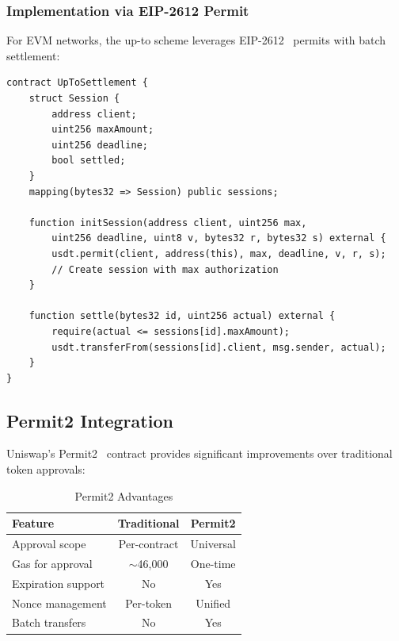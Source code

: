 \subsubsection{Implementation via EIP-2612 Permit}

For EVM networks, the up-to scheme leverages EIP-2612~\cite{eip2612} permits with batch settlement:

\begin{lstlisting}[language=solidity, caption={Up-To Settlement Contract (Simplified)}]
contract UpToSettlement {
    struct Session {
        address client;
        uint256 maxAmount;
        uint256 deadline;
        bool settled;
    }
    mapping(bytes32 => Session) public sessions;

    function initSession(address client, uint256 max,
        uint256 deadline, uint8 v, bytes32 r, bytes32 s) external {
        usdt.permit(client, address(this), max, deadline, v, r, s);
        // Create session with max authorization
    }

    function settle(bytes32 id, uint256 actual) external {
        require(actual <= sessions[id].maxAmount);
        usdt.transferFrom(sessions[id].client, msg.sender, actual);
    }
}
\end{lstlisting}

\subsection{Permit2 Integration}
\label{subsec:permit2}

Uniswap's Permit2~\cite{permit2} contract provides significant improvements over traditional token approvals:

\begin{table}[htbp]
\centering
\caption{Permit2 Advantages}
\label{tab:permit2-advantages}
\begin{tabular}{@{}lcc@{}}
\toprule
\textbf{Feature} & \textbf{Traditional} & \textbf{Permit2} \\
\midrule
Approval scope & Per-contract & Universal \\
Gas for approval & $\sim$46,000 & One-time \\
Expiration support & No & Yes \\
Nonce management & Per-token & Unified \\
Batch transfers & No & Yes \\
\bottomrule
\end{tabular}
\end{table}


